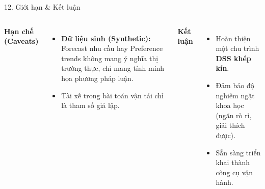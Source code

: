 \documentclass[t, aspectratio=169, 11pt]{beamer}
\begin{document}
\begin{frame}{12. Giới hạn \& Kết luận}
    \begin{columns}
        \textbf{Hạn chế (Caveats)}
        \begin{itemize}
            \item \textbf{Dữ liệu sinh (Synthetic):} Forecast nhu cầu hay Preference trends không mang ý nghĩa thị trường thực, chỉ mang tính minh họa phương pháp luận.
            \item Tài xế trong bài toán vận tải chỉ là tham số giả lập.
        \end{itemize}
        
        \textbf{Kết luận}
        \begin{itemize}
            \item Hoàn thiện một chu trình \textbf{DSS khép kín}.
            \item Đảm bảo độ nghiêm ngặt khoa học (ngăn rò rỉ, giải thích được).
            \item Sẵn sàng triển khai thành công cụ vận hành.
        \end{itemize}
    \end{columns}
\end{frame}
\end{document}
